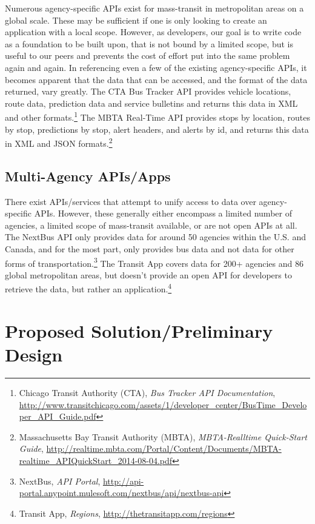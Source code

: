 \documentclass[12pt]{article}
\begin{document}
Numerous agency-specific APIs exist for mass-transit in metropolitan areas on a global scale.
These may be sufficient if one is only looking to create an application with a local scope. However,
as developers, our goal is to write code as a foundation to be built upon, that is not bound by a
limited scope, but is useful to our peers and prevents the cost of effort put into the same 
problem again and again. In referencing even a few of the existing agency-specific APIs, it
becomes apparent that the data that can be accessed, and the format of the data returned, 
vary greatly. The CTA Bus Tracker API provides vehicle locations, route data, prediction data and 
service bulletins and returns this data in XML and other formats.\footnote{Chicago Transit Authority (CTA), \textit{Bus Tracker API Documentation},
\url{http://www.transitchicago.com/assets/1/developer\_center/BusTime\_Developer\_API\_Guide.pdf}} The MBTA Real-Time API provides
stops by location, routes by stop, predictions by stop, alert headers, and alerts by id, and returns 
this data in XML and JSON formats.\footnote{Massachusetts Bay Transit Authority (MBTA), \textit{MBTA-Realltime Quick-Start Guide},
\url{http://realtime.mbta.com/Portal/Content/Documents/MBTA-realtime\_APIQuickStart\_2014-08-04.pdf}}

\subsection{Multi-Agency APIs/Apps}
There exist APIs/services that attempt to unify access to data over agency-specific APIs.
However, these generally either encompass a limited number of agencies, a limited scope
of mass-transit available, or are not open APIs at all. The NextBus API only provides data for
around 50 agencies within the U.S. and Canada, and for the most part, only provides bus data 
and not data for other forms of transportation.\footnote{NextBus, \textit{API Portal}, \url{http://api-portal.anypoint.mulesoft.com/nextbus/api/nextbus-api}} The Transit App covers data for 200+ agencies
and 86 global metropolitan areas, but doesn't provide an open API for developers to retrieve the
data, but rather an application.\footnote{Transit App, \textit{Regions}, \url{http://thetransitapp.com/regions}}


\section{Proposed Solution/Preliminary Design}
\end{document}
